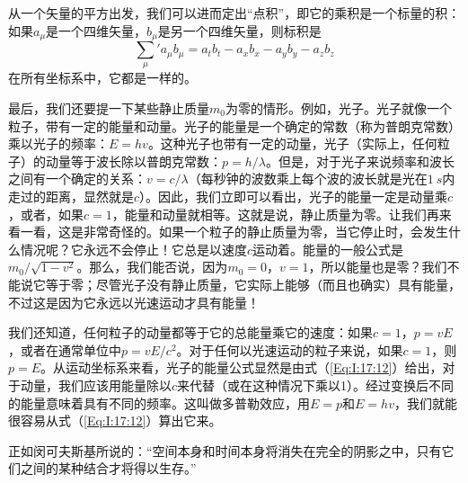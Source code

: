 从一个矢量的平方出发，我们可以进而定出“点积”，即它的乘积是一个标量的积：如果$a_\mu$是一个四维矢量，$b_\mu$是另一个四维矢量，则标积是
\begin{equation}
    \label{Eq:I:17:16}
    {\sum_{\mu}}' a_\mu b_\mu = a_tb_t - a_xb_x - a_yb_y - a_zb_z 
\end{equation}
在所有坐标系中，它都是一样的。

最后，我们还要提一下某些静止质量$m_0$为零的情形。例如，光子。光子就像一个粒子，带有一定的能量和动量。光子的能量是一个确定的常数（称为普朗克常数）乘以光子的频率：$E=hv$。这种光子也带有一定的动量，光子（实际上，任何粒子）的动量等于波长除以普朗克常数：$p=h/\lambda$。但是，对于光子来说频率和波长之间有一个确定的关系：$v=c/\lambda$（每秒钟的波数乘上每个波的波长就是光在$1~s$内走过的距离，显然就是$c$）。因此，我们立即可以看出，光子的能量一定是动量乘$c$，或者，如果$c=1$，能量和动量就相等。这就是说，静止质量为零。让我们再来看一看，这是非常奇怪的。如果一个粒子的静止质量为零，当它停止时，会发生什么情况呢？它永远不会停止！它总是以速度$c$运动着。能量的一般公式是$m_0/\sqrt{1-v^2}$。那么，我们能否说，因为$m_0=0$，$v=1$，所以能量也是零？我们不能说它等于零；尽管光子没有静止质量，它实际上能够（而且也确实）具有能量，不过这是因为它永远以光速运动才具有能量！

我们还知道，任何粒子的动量都等于它的总能量乘它的速度：如果$c=1$，$p=vE$，或者在通常单位中$p=vE/c^2$。对于任何以光速运动的粒子来说，如果$c=1$，则$p=E$。从运动坐标系来看，光子的能量公式显然是由式（\ref{Eq:I:17:12}）给出，对于动量，我们应该用能量除以$c$来代替（或在这种情况下乘以1）。经过变换后不同的能量意味着具有不同的频率。这叫做多普勒效应，用$E=p$和$E=hv$，我们就能很容易从式（\ref{Eq:I:17:12}）算出它来。

正如闵可夫斯基所说的：“空间本身和时间本身将消失在完全的阴影之中，只有它们之间的某种结合才将得以生存。”